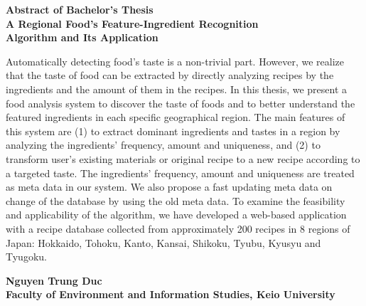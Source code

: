 \begin{center}

\begin{Large}
{\bf Abstract of Bachelor's Thesis} \\

\vspace{5mm}
{\bf A Regional Food's Feature-Ingredient Recognition\\ Algorithm and Its Application}

\end{Large}
\end{center}

\vspace{0.4cm}
Automatically detecting food's taste is a non-trivial part. However, we realize that the taste of food can be extracted by directly analyzing recipes by the ingredients and the amount of them in the recipes. 
In this thesis, we present a food analysis system to discover the taste of foods and to better understand the featured ingredients in each specific geographical region. The main features of this system are (1) to extract dominant ingredients and tastes in a region by analyzing the ingredients' frequency, amount and uniqueness, and (2) to transform user's existing materials or original recipe to a new recipe according to a targeted taste. The  ingredients' frequency, amount and uniqueness are treated as meta data in our system. We also propose a fast updating meta data on change of the database by using the old meta data. To examine the feasibility and applicability of the algorithm, we have developed a web-based application with a recipe database collected from approximately 200 recipes in 8 regions of Japan: Hokkaido, Tohoku, Kanto, Kansai, Shikoku, Tyubu, Kyusyu and Tyugoku. 
\vspace{-2.5mm}

\begin{flushright}
{\bf Nguyen Trung Duc}\\
\vspace{-2mm}
{\bf Faculty of Environment and Information Studies, Keio University}\\
\end{flushright}




